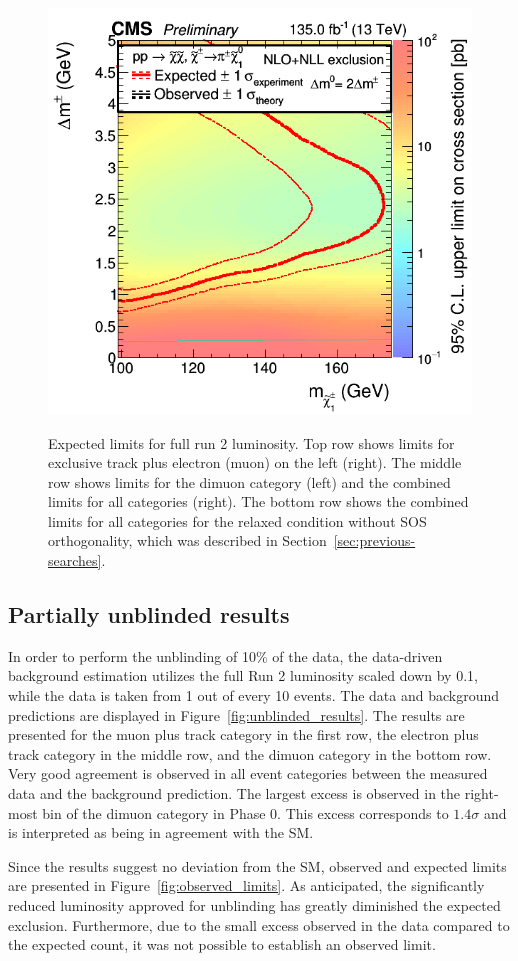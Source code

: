 \begin{figure}[!htb]
\includegraphics[width=0.48\linewidth]{plots/limits/expected/PureHiggsino_SoftPromptRun2Inc_ExpectedXSEC.png} \\

\caption[Expected limits for full run 2 luminosity]{Expected limits for full run 2 luminosity. Top row shows limits for exclusive track plus electron (muon) on the left (right). The middle row shows limits for the dimuon category (left) and the combined limits for all categories (right). The bottom row shows the combined limits for all categories for the relaxed condition without SOS orthogonality, which was described in Section~\ref{sec:previous-searches}.}
\label{fig:expected_limits}
\end{figure}

\subsection{Partially unblinded results}
\label{sec:unblinded-limits}

In order to perform the unblinding of 10\% of the data, the data-driven background estimation utilizes the full Run 2 luminosity scaled down by 0.1, while the data is taken from 1 out of every 10 events. The data and background predictions are displayed in Figure~\ref{fig:unblinded_results}. The results are presented for the muon plus track category in the first row, the electron plus track category in the middle row, and the dimuon category in the bottom row. Very good agreement is observed in all event categories between the measured data and the background prediction. The largest excess is observed in the right-most bin of the dimuon category in Phase 0. This excess corresponds to $1.4\sigma$ and is interpreted as being in agreement with the SM.

Since the results suggest no deviation from the SM, observed and expected limits are presented in Figure~\ref{fig:observed_limits}. As anticipated, the significantly reduced luminosity approved for unblinding has greatly diminished the expected exclusion. Furthermore, due to the small excess observed in the data compared to the expected count, it was not possible to establish an observed limit.

